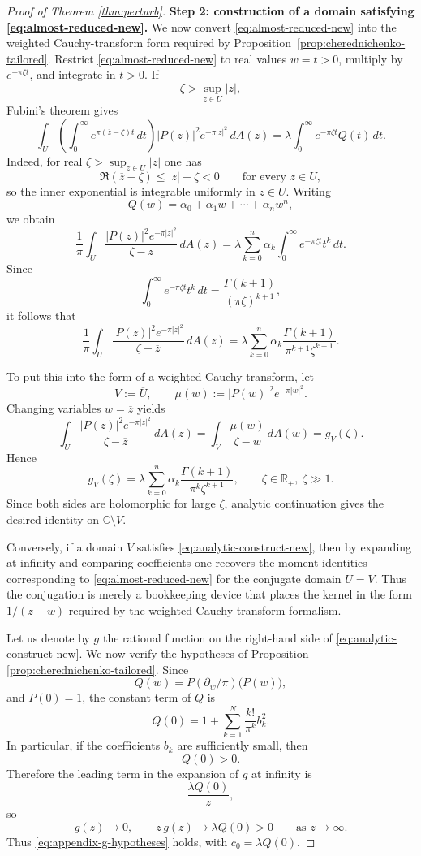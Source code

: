 \documentclass[a4paper,11pt,reqno]{amsart}
\numberwithin{equation}{section}
\theoremstyle{plain} %
\theoremstyle{definition} %
\theoremstyle{remark}
\newcommand{\R}{\mathbb{R}}
\newcommand{\C}{\mathbb{C}}
\begin{document}
\begin{proof}[Proof of Theorem \ref{thm:perturb}]
\medskip
\noindent\textbf{Step 2: construction of a domain satisfying \eqref{eq:almost-reduced-new}.}
We now convert \eqref{eq:almost-reduced-new} into the weighted Cauchy-transform
form required by Proposition~\ref{prop:cherednichenko-tailored}. Restrict
\eqref{eq:almost-reduced-new} to real values \(w=t>0\), multiply by
\(e^{-\pi \zeta t}\), and integrate in \(t>0\). If
\[
\zeta>\sup_{z\in U}|z|,
\]
Fubini's theorem gives
\[
\int_U \left(\int_0^\infty e^{\pi(\overline z-\zeta)t}\,dt\right)|P(z)|^2e^{-\pi|z|^2}\,dA(z)
=
\lambda\int_0^\infty e^{-\pi\zeta t}Q(t)\,dt.
\]
Indeed, for real \(\zeta>\sup_{z\in U}|z|\) one has
\[
\Re(\overline z-\zeta)\le |z|-\zeta<0
\qquad \text{for every } z\in U,
\]
so the inner exponential is integrable uniformly in \(z\in U\).
Writing
\[
Q(w)=\alpha_0+\alpha_1 w+\cdots+\alpha_n w^n,
\]
we obtain
\[
\frac{1}{\pi}\int_U \frac{|P(z)|^2e^{-\pi|z|^2}}{\zeta-\overline z}\,dA(z)
=
\lambda \sum_{k=0}^n \alpha_k \int_0^\infty e^{-\pi \zeta t} t^k\,dt.
\]
Since
\[
\int_0^\infty e^{-\pi \zeta t} t^k\,dt
=
\frac{\Gamma(k+1)}{(\pi \zeta)^{k+1}},
\]
it follows that
\[
\frac{1}{\pi}\int_U \frac{|P(z)|^2e^{-\pi|z|^2}}{\zeta-\overline z}\,dA(z)
=
\lambda \sum_{k=0}^n \alpha_k \frac{\Gamma(k+1)}{\pi^{k+1}\zeta^{k+1}}.
\]

To put this into the form of a weighted Cauchy transform, let
\[
V:=\overline U,
\qquad
\mu(w):=|P(\overline w)|^2 e^{-\pi|w|^2}.
\]
Changing variables $w=\overline z$ yields
\[
\int_U \frac{|P(z)|^2e^{-\pi|z|^2}}{\zeta-\overline z}\,dA(z)
=
\int_V \frac{\mu(w)}{\zeta-w}\,dA(w)
=
g_V(\zeta).
\]
Hence
\begin{equation}\label{eq:analytic-construct-new}
g_V(\zeta)
=
\lambda \sum_{k=0}^n \alpha_k \frac{\Gamma(k+1)}{\pi^k \zeta^{k+1}},
\qquad \zeta\in \R_+, \ \zeta\gg 1.
\end{equation}
Since both sides are holomorphic for large $\zeta$, analytic continuation gives the desired identity on $\C\setminus V$.

Conversely, if a domain $V$ satisfies \eqref{eq:analytic-construct-new}, then by expanding at infinity and comparing coefficients one recovers the moment identities corresponding to \eqref{eq:almost-reduced-new} for the conjugate domain $U=\overline V$. Thus the conjugation is merely a bookkeeping device that places the kernel in the form \(1/(z-w)\) required by the weighted Cauchy transform formalism.

Let us denote by $g$ the rational function on the right-hand side of \eqref{eq:analytic-construct-new}. We now verify the hypotheses of Proposition \ref{prop:cherednichenko-tailored}. Since
\[
Q(w)=P(\partial_w/\pi)\big(P(w)\big),
\]
and $P(0)=1$, the constant term of $Q$ is
\[
Q(0)=1+\sum_{k=1}^N \frac{k!}{\pi^k} b_k^2.
\]
In particular, if the coefficients $b_k$ are sufficiently small, then
\[
Q(0)>0.
\]
Therefore the leading term in the expansion of $g$ at infinity is
\[
\frac{\lambda Q(0)}{z},
\]
so
\[
g(z)\to 0,
\qquad
z\,g(z)\to \lambda Q(0)>0
\qquad \text{as } z\to\infty.
\]
Thus \eqref{eq:appendix-g-hypotheses} holds, with \(c_0=\lambda Q(0)\).


\end{proof}
\end{document}
